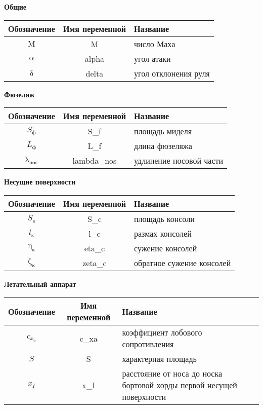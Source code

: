 \documentclass[a4paper, 12pt]{report}
\renewcommand{\alpha}{\upalpha}
\renewcommand{\delta}{\updelta}
\renewcommand{\lambda}{\uplambda}
\renewcommand{\zeta}{\upzeta}
\renewcommand{\eta}{\upeta}
\newcommand{\Mach}{\mathrm{M}}
\begin{document}
	\begin{center}
		\textbf{Общие}
		\begin{tabular}{c c p{8cm}}
			Обозначение & Имя переменной & Название \\ \hline
			$ \Mach  $  & M              & число Маха \\ \hline
			$ \alpha $  & alpha          & угол атаки \\ \hline
			$ \delta $  & delta          & угол отклонения руля \\ \hline		
		\end{tabular}
		\bigbreak
		
		\textbf{Фюзеляж}
		\begin{tabular}{c c p{8cm}}
			Обозначение             & Имя переменной  & Название \\ \hline
			$ S_\text{ф}    $       & S\_f            & площадь миделя \\ \hline
			$ L_\text{ф}    $       & L\_f            & длина фюзеляжа \\ \hline
			$ \lambda_\text{нос} $  & lambda\_nos     & удлинение носовой части \\ \hline		
		\end{tabular}
		\bigbreak
		
		\textbf{Несущие поверхности}
		\begin{tabular}{c c p{8cm}}
			Обозначение             & Имя переменной  & Название \\ \hline
			$ S_\text{к}   $        & S\_c            & площадь консоли \\ \hline
			$ l_\text{к}    $       & l\_c            & размах консолей \\ \hline
			$ \eta_\text{к} $       & eta\_c           & сужение консолей \\ \hline
			$ \zeta_\text{к} $      & zeta\_c         & обратное сужение консолей \\ \hline		
		\end{tabular}
		\bigbreak
		
		\textbf{Летательный аппарат}
		\begin{tabular}{c c p{8cm}}
			Обозначение             & Имя переменной  & Название \\ \hline
			$ c_{x_a}   $           & c\_xa           & коэффициент лобового сопротивления \\ \hline
			$ S       $             & S               & характерная площадь \\ \hline
			$ x_I $                 & x\_I            & расстояние от носа до носка бортовой хорды первой несущей поверхности \\ \hline		
		\end{tabular}
	\end{center}
\end{document}
